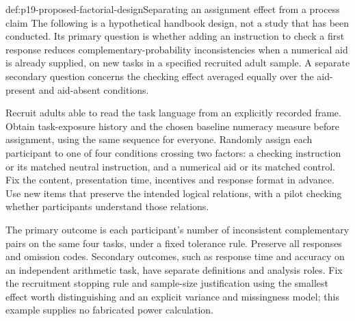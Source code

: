 \begin{hbexample}{def:p19-proposed-factorial-design}{Separating an assignment effect from a process claim}
The following is a hypothetical handbook design, not a study that has been
conducted. Its primary question is whether adding an instruction to check a
first response reduces complementary-probability inconsistencies when a
numerical aid is already supplied, on new tasks in a specified recruited adult
sample. A separate secondary question concerns the checking effect averaged
equally over the aid-present and aid-absent conditions.

Recruit adults able to read the task language from an explicitly recorded
frame. Obtain task-exposure history and the chosen baseline numeracy measure
before assignment, using the same sequence for everyone. Randomly assign each
participant to one of four conditions crossing two factors: a checking
instruction or its matched neutral instruction, and a numerical aid or its
matched control. Fix the content, presentation time, incentives and response
format in advance. Use new items that preserve the intended logical relations,
with a pilot checking whether participants understand those relations.

The primary outcome is each participant's number of inconsistent complementary
pairs on the same four tasks, under a fixed tolerance rule. Preserve all
responses and omission codes. Secondary outcomes, such as response time and
accuracy on an independent arithmetic task, have separate definitions and
analysis roles. Fix the recruitment stopping rule and sample-size justification
using the smallest effect worth distinguishing and an explicit variance and
missingness model; this example supplies no fabricated power calculation.


\end{hbexample}
